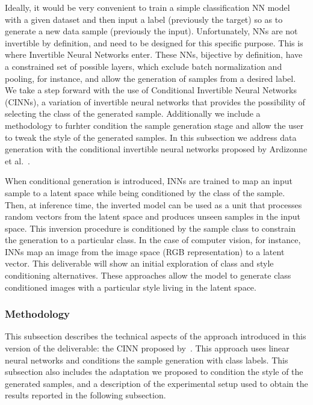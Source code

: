 Ideally, it would be very convenient to train a simple classification NN model with a given dataset and then input a label (previously the target) so as to generate a new data sample (previously the input). Unfortunately, NNs are not invertible by definition, and need to be designed for this specific purpose. This is where Invertible Neural Networks enter. These NNs, bijective by definition, have a constrained set of possible layers, which exclude batch normalization and pooling, for instance, and allow the generation of samples from a desired label. We take a step forward with the use of Conditional Invertible Neural Networks (CINNs), a variation of invertible neural networks that provides the possibility of selecting the class of the generated sample. Additionally we include a methodology to furhter condition the sample generation stage and allow the user to tweak the style of the generated samples. In this subsection we address data generation with the conditional invertible neural networks proposed by Ardizonne et al.~\cite{2019_arxiv_cinn}. 

When conditional generation is introduced, INNs are trained to map an input sample to a latent space while being conditioned by the class of the sample. Then, at inference time, the inverted model can be used as a unit that processes random vectors from the latent space and produces unseen samples in the input space. This inversion procedure is conditioned by the sample class to constrain the generation to a particular class. In the case of computer vision, for instance, INNs map an image from the image space (RGB representation) to a latent vector. This deliverable will show an initial exploration of class and style conditioning alternatives. These approaches allow the model to generate class conditioned images with a particular style living in the latent space.

        
\subsubsection{Methodology}

This subsection describes the technical aspects of the approach introduced in this version of the deliverable: the CINN proposed by~\cite{2019_arxiv_cinn}. This approach uses linear neural networks and conditions the sample generation with class labels. This subsection also includes the adaptation we proposed to condition the style of the generated samples, and a description of the experimental setup used to obtain the results reported in the following subsection.

